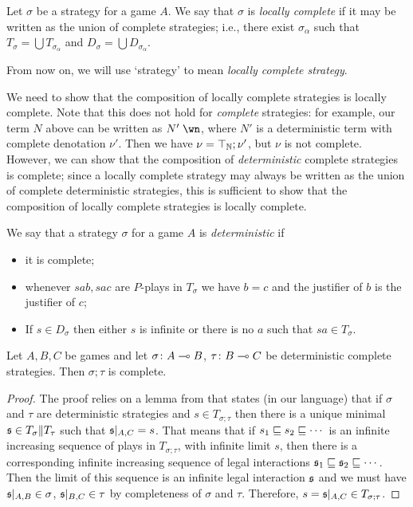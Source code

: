 \documentclass[sigplan,10pt,review]{acmart}\settopmatter{printfolios=true,printccs=false,printacmref=false}
\begin{document}
\begin{definition}
  Let $\sigma$ be a strategy for a game $A$.  
  We say that $\sigma$ is \emph{locally complete} if it may be written as the union of complete strategies; i.e., there exist $\sigma_\alpha$ such that $T_\sigma=\bigcup T_{\sigma_\alpha}$ and $D_\sigma=\bigcup D_{\sigma_\alpha}$.
\end{definition}

From now on, we will use `strategy' to mean \emph{locally complete strategy}.

We need to show that the composition of locally complete strategies is locally complete.  
Note that this does not hold for \emph{complete} strategies: for example, our term $N$ above can be written as $N'\;\wn$, where $N'$ is a deterministic term with complete denotation $\nu'$.  
Then we have $\nu=\top_{\mathbb{N}};\nu'$, but $\nu$ is not complete.
However, we can show that the composition of \emph{deterministic} complete strategies is complete; since a locally complete strategy may always be written as the union of complete deterministic strategies, this is sufficient to show that the composition of locally complete strategies is locally complete.

\begin{definition}
  We say that a strategy $\sigma$ for a game $A$ is \emph{deterministic} if
  \begin{itemize}
    \item it is complete;
    \item whenever $sab,sac$ are $P$-plays in $T_\sigma$ we have $b=c$ and the justifier of $b$ is the justifier of $c$;
    \item If $s\in D_\sigma$ then either $s$ is infinite or there is no $a$ such that $sa\in T_\sigma$.
  \end{itemize}
\end{definition}

\begin{lemma}
  Let $A,B,C$ be games and let $\sigma\colon A\multimap B$, $\tau\colon B\multimap C$ be deterministic complete strategies.  
  Then $\sigma;\tau$ is complete.
\end{lemma}
\begin{proof}
  The proof relies on a lemma from \cite{hoPcf} that states (in our language) that if $\sigma$ and $\tau$ are deterministic strategies and $s\in T_{\sigma;\tau}$ then there is a unique minimal $\mathfrak s\in T_\sigma\|T_\tau$ such that $\mathfrak s\vert_{A,C}=s$.  
  That means that if $s_1\sqsubseteq s_2\sqsubseteq \cdots$ is an infinite increasing sequence of plays in $T_{\sigma;\tau}$, with infinite limit $s$, then there is a corresponding infinite increasing sequence of legal interactions $\mathfrak s_1 \sqsubseteq \mathfrak s_2 \sqsubseteq \cdots$.  
  Then the limit of this sequence is an infinite legal interaction $\mathfrak s$ and we must have $\mathfrak s\vert_{A,B}\in\sigma$, $\mathfrak s\vert_{B,C}\in\tau$ by completeness of $\sigma$ and $\tau$.  
  Therefore, $s=\mathfrak s\vert_{A,C}\in T_{\sigma;\tau}$.
\end{proof}
\end{document}
